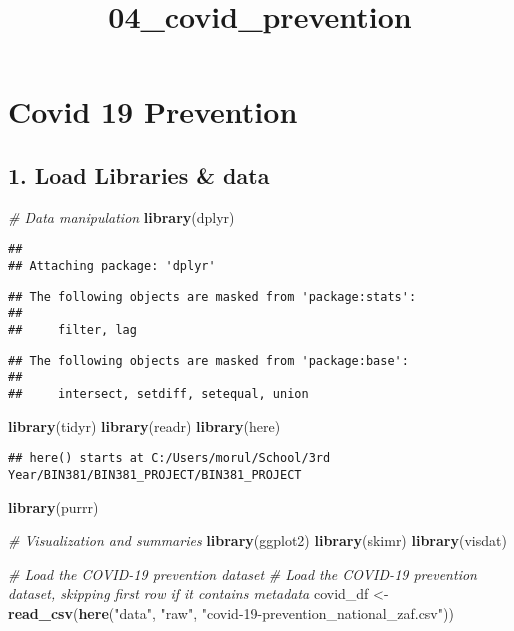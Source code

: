 \documentclass[
]{article}
\title{04\_covid\_prevention}
\author{}
\date{\vspace{-2.5em}}
\newenvironment{Shaded}{\begin{snugshade}}{\end{snugshade}}
\newcommand{\CommentTok}[1]{\textcolor[rgb]{0.56,0.35,0.01}{\textit{#1}}}
\newcommand{\FunctionTok}[1]{\textcolor[rgb]{0.13,0.29,0.53}{\textbf{#1}}}
\newcommand{\NormalTok}[1]{#1}
\newcommand{\OtherTok}[1]{\textcolor[rgb]{0.56,0.35,0.01}{#1}}
\newcommand{\StringTok}[1]{\textcolor[rgb]{0.31,0.60,0.02}{#1}}
\begin{document}
\maketitle

\section{Covid 19 Prevention}\label{covid-19-prevention}

\subsection{1. Load Libraries \& data}\label{load-libraries-data}

\begin{Shaded}
\begin{Highlighting}[]
\CommentTok{\# Data manipulation}
\FunctionTok{library}\NormalTok{(dplyr)}
\end{Highlighting}
\end{Shaded}

\begin{verbatim}
## 
## Attaching package: 'dplyr'
\end{verbatim}

\begin{verbatim}
## The following objects are masked from 'package:stats':
## 
##     filter, lag
\end{verbatim}

\begin{verbatim}
## The following objects are masked from 'package:base':
## 
##     intersect, setdiff, setequal, union
\end{verbatim}

\begin{Shaded}
\begin{Highlighting}[]
\FunctionTok{library}\NormalTok{(tidyr)}
\FunctionTok{library}\NormalTok{(readr)}
\FunctionTok{library}\NormalTok{(here)}
\end{Highlighting}
\end{Shaded}

\begin{verbatim}
## here() starts at C:/Users/morul/School/3rd Year/BIN381/BIN381_PROJECT/BIN381_PROJECT
\end{verbatim}

\begin{Shaded}
\begin{Highlighting}[]
\FunctionTok{library}\NormalTok{(purrr)}

\CommentTok{\# Visualization and summaries}
\FunctionTok{library}\NormalTok{(ggplot2)}
\FunctionTok{library}\NormalTok{(skimr)}
\FunctionTok{library}\NormalTok{(visdat)}

\CommentTok{\# Load the COVID{-}19 prevention dataset}
\CommentTok{\# Load the COVID{-}19 prevention dataset, skipping first row if it contains metadata}
\NormalTok{covid\_df }\OtherTok{\textless{}{-}} \FunctionTok{read\_csv}\NormalTok{(}\FunctionTok{here}\NormalTok{(}\StringTok{"data"}\NormalTok{, }\StringTok{"raw"}\NormalTok{, }\StringTok{"covid{-}19{-}prevention\_national\_zaf.csv"}\NormalTok{))}
\end{Highlighting}
\end{Shaded}
\end{document}
